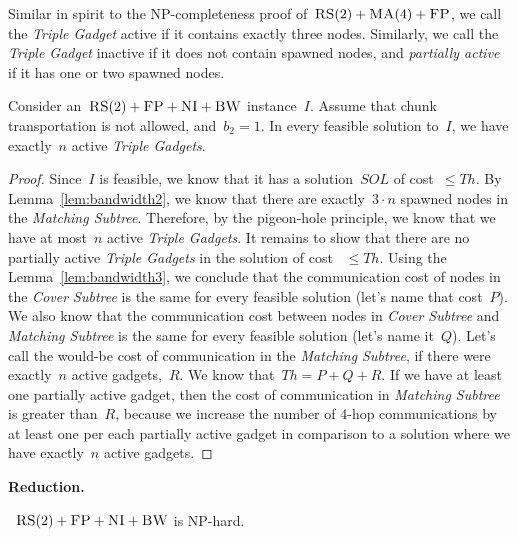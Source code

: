 \documentclass[preprint,12pt]{elsarticle}
\newcommand{\CC}{\textsc{NI}}
\newcommand{\FP}{\textsc{FP}}
\newcommand{\RS}{\textsc{RS}}
\newcommand{\BW}{\textsc{BW}}
\newcommand{\MA}{\textsc{MA}}
\newcommand{\MatchSubtree}{{\emph{Matching Subtree}}}
\newcommand{\CoverSubtree}{{\emph{Cover Subtree}}}
\newcommand{\TripleGadget}{{\emph{Triple Gadget}}}
\newcommand{\TripleGadgets}{{\emph{Triple Gadgets}}}
\newcommand{\CostCom}{\ensuremath{b_2}}
\newcommand{\Thr}{\ensuremath{Th}}
\newcommand{\Sol}{\ensuremath{SOL}}
\begin{document}
Similar in spirit to the NP-completeness proof of~$\RS(2)+\MA(4)+\FP$,
we call the {\TripleGadget} active if it contains exactly three nodes. 
Similarly, we call the {\TripleGadget} inactive if it
does not contain spawned nodes, and \emph{partially active} if it
has one or two
spawned nodes.

\begin{lemma}
  Consider an~$\RS(2)+\FP+\CC+\BW$ instance~$I$.  Assume that 
  chunk transportation is not allowed, and~$\CostCom = 1$.
  In every feasible solution to~$I$, we have exactly~$n$ active
  {\TripleGadgets}.
  \label{lem:full-or-empty}
\end{lemma}

\begin{proof}
  Since~$I$ is feasible, we know that it has a solution~$\Sol$ of
  cost~$\leq \Thr$.
  By Lemma~\ref{lem:bandwidth2}, we know that there are
  exactly~$3\cdot n$ spawned nodes in the {\MatchSubtree}. Therefore, by
  the pigeon-hole principle, we know that we have at most~$n$
  active {\TripleGadgets}. It remains to show that there
  are no partially active {\TripleGadgets} in the solution of cost
 ~$\leq \Thr$.
  Using the Lemma~\ref{lem:bandwidth3}, 
  we conclude that the communication cost of
  nodes in the {\CoverSubtree} is the same for every feasible solution
  (let's name that cost~$P$). We also know that the communication cost
  between nodes in {\CoverSubtree} and {\MatchSubtree} is the same for
  every feasible solution (let's name it~$Q$). Let's call the
  would-be cost of communication in the {\MatchSubtree}, if there were
  exactly~$n$ active gadgets,~$R$.
  We know that~$\Thr = P+Q+R$. If we have at least one partially active
  gadget, then the cost of communication in {\MatchSubtree} is greater
  than~$R$, because we increase the number of 4-hop communications by
  at least one per each partially active gadget in comparison to a solution
  where we have exactly~$n$ active gadgets.
\end{proof}

\noindent \textbf{Reduction.}

\begin{theorem}
 ~$\RS(2)+\FP+\CC+\BW$ is NP-hard.
\end{theorem}
\end{document}
